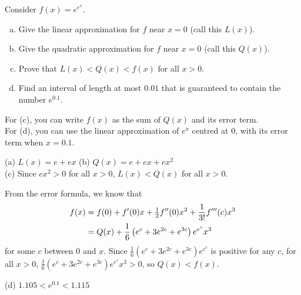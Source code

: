 \begin{question}[2012H]
Consider $f(x)=e^{e^x}$.
\begin{enumerate}[(a)]
\item Give the linear approximation for $f$ near $x=0$ (call this
$L(x)$).
\item Give the quadratic approximation for $f$ near $x=0$ (call
this $Q(x)$).
\item Prove that $L(x)<Q(x)<f(x)$ for all $x>0$.
\item Find an interval of length
at most $0.01$ that is guaranteed to contain the number $e^{0.1}$.
\end{enumerate}
\end{question}
\begin{hint} For (c), you can write $f(x)$ as the sum of $Q(x)$ and its error term.\\
For (d), you can use the linear approximation of $e^x$  centred at $0$, with its error term when $x=0.1$.
\end{hint}
\begin{answer}
(a) $L(x)=e+ex$ \qquad (b) $Q(x)=e+ex+ex^2$\\
(c) Since $ex^2 >0$ for all $x>0$, $L(x)<Q(x)$ for all $x>0$.

From the error formula, we know that
\begin{align*}
f(x)&=f(0)+f'(0)x+\tfrac{1}{2} f''(0)x^2
+\dfrac{1}{3!}f'''(c)x^{3}\\
&=Q(x)+\frac{1}{6}\left(e^c+3e^{2c}+e^{3c}\right)e^{e^c}x^3
\end{align*}
for some $c$ between $0$ and $x$.
Since $\frac{1}{6}\left(e^c+3e^{2c}+e^{3c}\right)e^{e^c}$ is positive for any $c$, for
all $x>0$,
$\frac{1}{6}\left(e^c+3e^{2c}+e^{3c}\right)e^{e^c}x^3>0$, so
$Q(x)<f(x)$.

(d) $1.105<e^{0.1}<1.115$
\end{answer}
